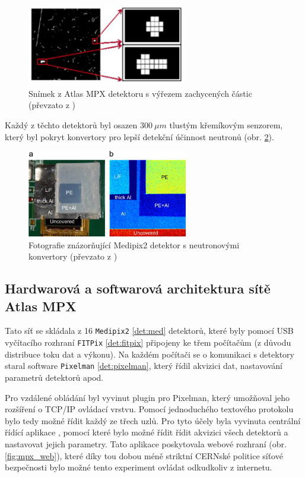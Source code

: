 \begin{figure}[ht]
	\begin{center}
		\includegraphics[width=7cm]{figures/mpx_cluster.png}
		\caption{Snímek z Atlas MPX detektoru s výřezem zachycených částic (převzato z \cite{atlasmpx})}
		\label{fig:mpx_cluster}
	\end{center}
\end{figure}


Každý z těchto detektorů byl osazen $300~\mu m$ tlustým křemíkovým senzorem, který byl pokryt konvertory pro lepší detekční účinnost neutronů (obr. \ref{fig:mpx_lay}).

\begin{figure}[ht]
	\begin{center}
		\includegraphics[width=7cm]{figures/mpx-layers.jpg}
		\caption{Fotografie znázorňující Medipix2 detektor s neutronovými konvertory (převzato z \cite{Vykydal200935})}
		\label{fig:mpx_lay}
	\end{center}
\end{figure}

\subsection{Hardwarová a softwarová architektura sítě Atlas MPX}
Tato síť se skládala z 16 \texttt{Medipix2} \ref{det:med} detektorů, které byly pomocí USB vyčítacího rozhraní \texttt{FITPix} \ref{det:fitpix} připojeny ke třem počítačům (z důvodu distribuce toku dat a výkonu). Na každém počítači se o komunikaci s detektory staral software \texttt{Pixelman} \ref{det:pixelman}, který řídil akvizici dat, nastavování parametrů detektorů apod. 

Pro vzdálené obládání byl vyvinut plugin pro Pixelman, který umožňoval jeho rozšíření o TCP/IP ovládací vrstvu. Pomocí jednoduchého textového protokolu bylo tedy možné řídit každý ze třech uzlů. Pro tyto účely byla vyvinuta centrální řídící aplikace \cite{Turecek2011S45}, pomocí které bylo možné řídit řídit akvizici všech detektorů a nastavovat jejich parametry. Tato aplikace poskytovala webové rozhraní (obr. \ref{fig:mpx_web}), které díky tou dobou méně striktní CERNské politice síťové bezpečnosti bylo možné tento experiment ovládat odkudkoliv z internetu.


